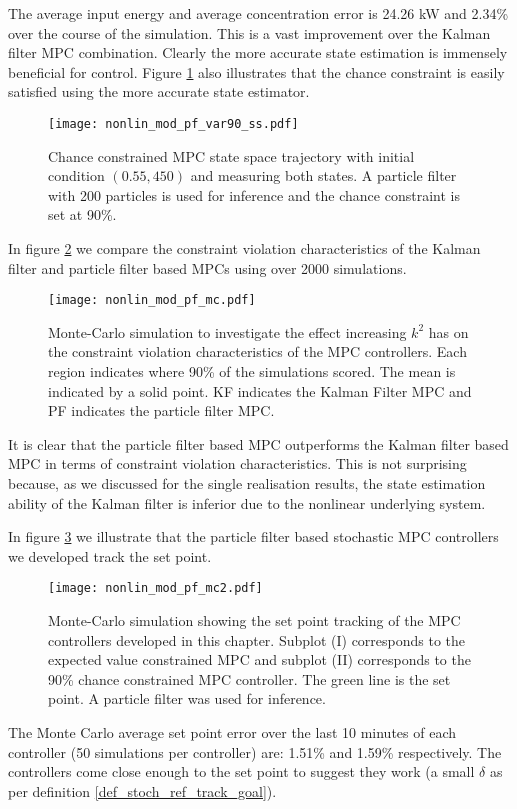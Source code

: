 The average input energy and average concentration error is 24.26 kW and 2.34\% over the course of the simulation. This is a vast improvement over the Kalman filter MPC combination. Clearly the more accurate state estimation is immensely beneficial for control. Figure \ref{fig_nonlin_mod_pf_var90_ss} also illustrates that the chance constraint is easily satisfied using the more accurate state estimator.
\begin{figure}[H] 
\centering
\texttt{[image: nonlin\_mod\_pf\_var90\_ss.pdf]}
\caption{Chance constrained MPC state space trajectory with initial condition $(0.55, 450)$ and measuring both states. A particle filter with 200 particles is used for inference and the chance constraint is set at 90\%.}
\label{fig_nonlin_mod_pf_var90_ss}
\end{figure}
In figure \ref{fig_nonlin_mod_pf_mc} we compare the constraint violation characteristics of the Kalman filter and particle filter based MPCs using over 2000 simulations. 
\begin{figure}[H] 
\centering
\texttt{[image: nonlin\_mod\_pf\_mc.pdf]}
\caption{Monte-Carlo simulation to investigate the effect increasing $k^2$ has on the constraint violation characteristics of the MPC controllers. Each region indicates where 90\% of the simulations scored. The mean is indicated by a solid point. KF indicates the Kalman Filter MPC and PF indicates the particle filter MPC.}
\label{fig_nonlin_mod_pf_mc}
\end{figure}
It is clear that the particle filter based MPC outperforms the Kalman filter based MPC in terms of constraint violation characteristics. This is not surprising because, as we discussed for the single realisation results, the state estimation ability of the Kalman filter is inferior due to the nonlinear underlying system.

In figure \ref{fig_nonlin_mod_pf_mc2} we illustrate that the particle filter based stochastic MPC controllers we developed track the set point.
\begin{figure}[H] 
\centering
\texttt{[image: nonlin\_mod\_pf\_mc2.pdf]}
\caption{Monte-Carlo simulation showing the set point tracking of the MPC controllers developed in this chapter. Subplot (I) corresponds to the expected value constrained MPC and subplot (II) corresponds to the 90\% chance constrained MPC controller. The green line is the set point. A particle filter was used for inference.}
\label{fig_nonlin_mod_pf_mc2}
\end{figure}
The Monte Carlo average set point error over the last 10 minutes of each controller (50 simulations per controller) are: 1.51\% and 1.59\% respectively. The controllers come close enough to the set point to suggest they work (a small $\delta$ as per definition \ref{def_stoch_ref_track_goal}).

